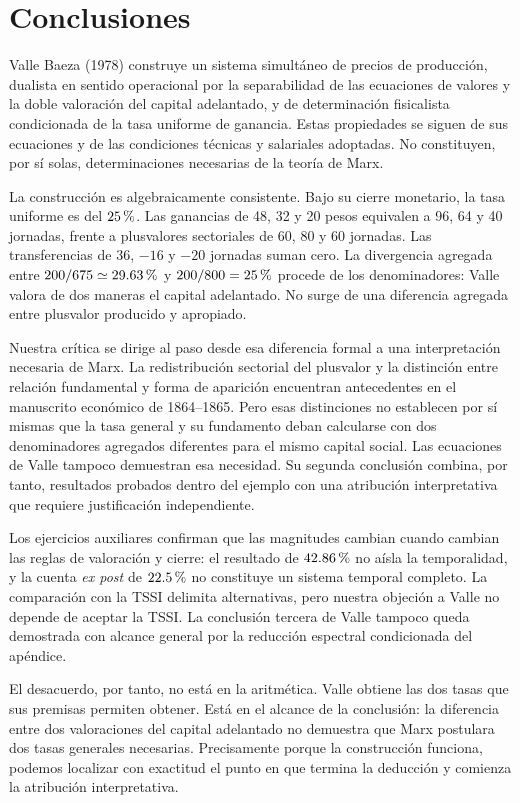 \documentclass[10pt,twoside]{article}
\newcommand{\pct}{\ifmmode\text{\char37}\else\char37\fi}
\begin{document}
\section*{Conclusiones}
Valle Baeza (1978) construye un sistema simultáneo de precios de producción, dualista en sentido operacional por la separabilidad de las ecuaciones de valores y la doble valoración del capital adelantado, y de determinación fisicalista condicionada de la tasa uniforme de ganancia. Estas propiedades se siguen de sus ecuaciones y de las condiciones técnicas y salariales adoptadas. No constituyen, por sí solas, determinaciones necesarias de la teoría de Marx.

La construcción es algebraicamente consistente. Bajo su cierre monetario, la tasa uniforme es del $25\,\pct$. Las ganancias de 48, 32 y 20 pesos equivalen a 96, 64 y 40 jornadas, frente a plusvalores sectoriales de 60, 80 y 60 jornadas. Las transferencias de $36$, $-16$ y $-20$ jornadas suman cero. La divergencia agregada entre $200/675\simeq29.63\,\pct$ y $200/800=25\,\pct$ procede de los denominadores: Valle valora de dos maneras el capital adelantado. No surge de una diferencia agregada entre plusvalor producido y apropiado.

Nuestra crítica se dirige al paso desde esa diferencia formal a una interpretación necesaria de Marx. La redistribución sectorial del plusvalor y la distinción entre relación fundamental y forma de aparición encuentran antecedentes en el manuscrito económico de 1864--1865. Pero esas distinciones no establecen por sí mismas que la tasa general y su fundamento deban calcularse con dos denominadores agregados diferentes para el mismo capital social. Las ecuaciones de Valle tampoco demuestran esa necesidad. Su segunda conclusión combina, por tanto, resultados probados dentro del ejemplo con una atribución interpretativa que requiere justificación independiente.

Los ejercicios auxiliares confirman que las magnitudes cambian cuando cambian las reglas de valoración y cierre: el resultado de $42.86\,\pct$ no aísla la temporalidad, y la cuenta \emph{ex post} de $22.5\,\pct$ no constituye un sistema temporal completo. La comparación con la TSSI delimita alternativas, pero nuestra objeción a Valle no depende de aceptar la TSSI. La conclusión tercera de Valle tampoco queda demostrada con alcance general por la reducción espectral condicionada del apéndice.

El desacuerdo, por tanto, no está en la aritmética. Valle obtiene las dos tasas que sus premisas permiten obtener. Está en el alcance de la conclusión: la diferencia entre dos valoraciones del capital adelantado no demuestra que Marx postulara dos tasas generales necesarias. Precisamente porque la construcción funciona, podemos localizar con exactitud el punto en que termina la deducción y comienza la atribución interpretativa.
\end{document}
